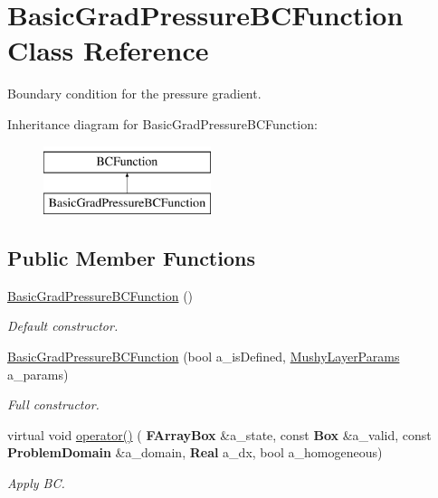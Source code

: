 \hypertarget{class_basic_grad_pressure_b_c_function}{}\section{Basic\+Grad\+Pressure\+B\+C\+Function Class Reference}
\label{class_basic_grad_pressure_b_c_function}


Boundary condition for the pressure gradient.  


Inheritance diagram for Basic\+Grad\+Pressure\+B\+C\+Function\+:\begin{figure}[H]
\begin{center}
\leavevmode
\includegraphics[height=2.000000cm]{class_basic_grad_pressure_b_c_function}
\end{center}
\end{figure}
\subsection*{Public Member Functions}
\begin{DoxyCompactItemize}
\item 
\mbox{\label{class_basic_grad_pressure_b_c_function_a26372a752dd51acbaa659039b70980e4}} 
\hyperlink{class_basic_grad_pressure_b_c_function_a26372a752dd51acbaa659039b70980e4}{Basic\+Grad\+Pressure\+B\+C\+Function} ()
\begin{DoxyCompactList}\small\item\em Default constructor. \end{DoxyCompactList}\item 
\mbox{\label{class_basic_grad_pressure_b_c_function_ae6c3e1cbb5fa5fc028d678ab12f133e6}} 
\hyperlink{class_basic_grad_pressure_b_c_function_ae6c3e1cbb5fa5fc028d678ab12f133e6}{Basic\+Grad\+Pressure\+B\+C\+Function} (bool a\+\_\+is\+Defined, \hyperlink{class_mushy_layer_params}{Mushy\+Layer\+Params} a\+\_\+params)
\begin{DoxyCompactList}\small\item\em Full constructor. \end{DoxyCompactList}\item 
\mbox{\label{class_basic_grad_pressure_b_c_function_a96a8f342fb3f7cfffe2998ec22f07bc9}} 
virtual void \hyperlink{class_basic_grad_pressure_b_c_function_a96a8f342fb3f7cfffe2998ec22f07bc9}{operator()} (\textbf{ F\+Array\+Box} \&a\+\_\+state, const \textbf{ Box} \&a\+\_\+valid, const \textbf{ Problem\+Domain} \&a\+\_\+domain, \textbf{ Real} a\+\_\+dx, bool a\+\_\+homogeneous)
\begin{DoxyCompactList}\small\item\em Apply BC. \end{DoxyCompactList}\end{DoxyCompactItemize}
